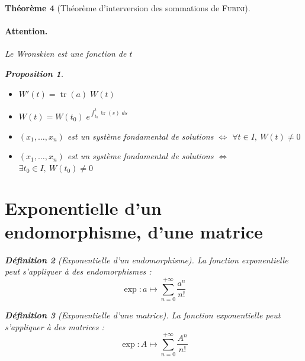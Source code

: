 \documentclass[11pt,a4paper]{report}
\newtheorem{theorem}{Théorème}[chapter]
\newtheorem{prop}[theorem]{Proposition}
\theoremstyle{definition}
\newtheorem{dfn}[theorem]{Définition}
\begin{document}
\begin{theorem}[Théorème d'interversion des sommations de \textsc{Fubini}]
{{\paragraph{Attention.} Le Wronskien est une fonction de $t$

\begin{prop}
\begin{itemize}
    \item $W'(t)=\operatorname{tr} (a)\; W(t)$
    \item $ W(t) = W(t_0) \; e^{\int_{t_0}^t \operatorname{tr} (s) \; ds}$
    \item $(x_1, \ldots ,x_n)$ est un système fondamental de solutions $\Longleftrightarrow$ $\forall t\in I,\: W(t) \neq 0$
    \item $(x_1, \ldots ,x_n)$ est un système fondamental de solutions $\Longleftrightarrow$ $\exists t_0\in I,\: W(t_0) \neq 0$
\end{itemize}
\end{prop}


\section{Exponentielle d'un endomorphisme, d'une matrice} %
\label{sec:exponentielle_d_un_endomorphisme_d_une_matrice}
\begin{dfn}[Exponentielle d'un endomorphisme]
     La fonction exponentielle peut s'appliquer à des endomorphismes : 
     \begin{equation}
     \exp : a \longmapsto \sum_{n=0}^{+\infty} \dfrac{a^n}{n !}
     \end{equation}
     
\end{dfn}
\begin{dfn}[Exponentielle d'une matrice]
     La fonction exponentielle peut s'appliquer à des matrices : 
     \begin{equation}
     \exp : A \longmapsto \sum_{n=0}^{+\infty} \dfrac{A^n}{n !}
     \end{equation}
     

\end{dfn}}}
\end{theorem}
\end{document}
